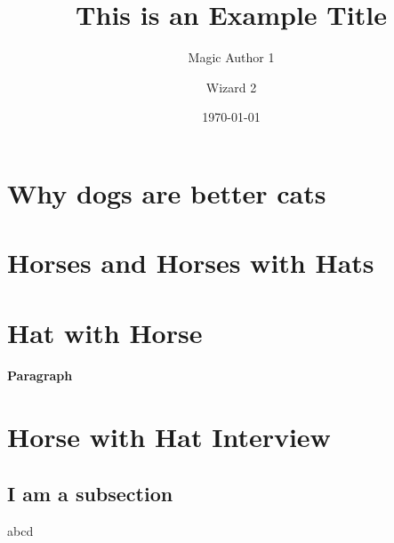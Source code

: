 \documentclass[a3paper, protrait, english]{uulm-cs-poster}
\title{This is an Example Title}
\author{Magic Author 1\and Wizard 2}
\institute{The Amazing Institute}
\date{\today}
\begin{document}
\maketitle
\section*{Why dogs are better cats}
\lipsum[2]
\vfil
\begin{multicols}{3}
\section*{Horses and Horses with Hats}
   \lipsum[1-4]
\section*{Hat with Horse}
   \lipsum[4-6]
   \paragraph{Paragraph}\lipsum[7]
\end{multicols}
\lipsum[2]
\section*{Horse with Hat Interview}
\begin{multicols}{4}
   \lipsum[2]
   \subsection*{I am a subsection}
   abcd
\end{multicols}
\end{document}
